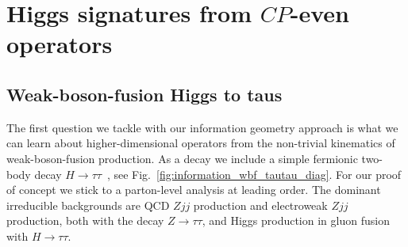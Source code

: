 


\section{Higgs signatures from $CP$-even operators}
\label{sec:information_application}

\subsection{Weak-boson-fusion Higgs to taus}
\label{sec:information_wbf_taus}

The first question we tackle with our information geometry approach is
what we can learn about higher-dimensional operators from the
non-trivial kinematics of weak-boson-fusion production. As a decay we
include a simple fermionic two-body decay
$H \to \tau \tau$~\cite{wbf_tau}, see Fig.~\ref{fig:information_wbf_tautau_diag}.
For our proof of concept we stick to a parton-level analysis at
leading order.  The dominant irreducible backgrounds are QCD $Zjj$
production and electroweak $Zjj$ production, both with the decay
$Z \to \tau \tau$, and Higgs production in gluon fusion with
$H \to \tau \tau$. 

